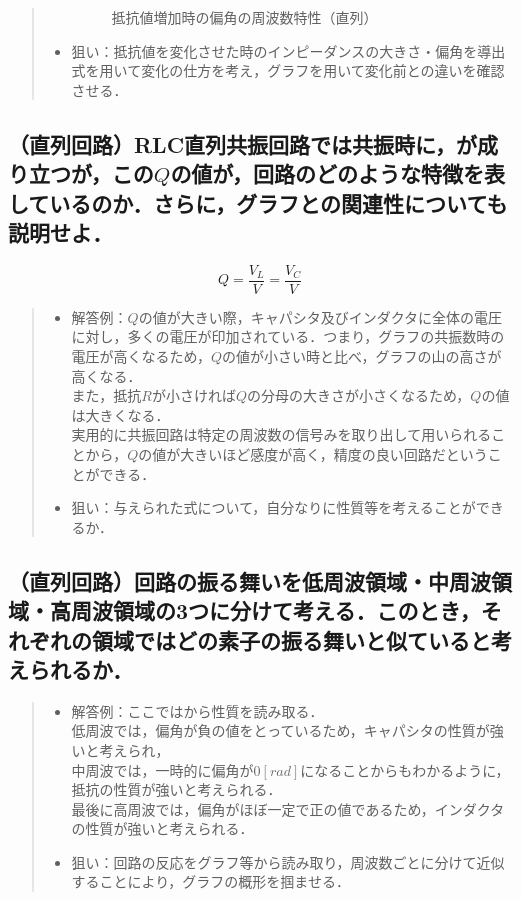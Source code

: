 \documentclass[11pt,dvipdfmx]{jarticle}
\begin{document}
\begin{quote}
\begin{itemize}
\begin{figure}[hbpt]
 \caption{抵抗値増加時の偏角の周波数特性（直列）}
 \label{fig:fig12}
\end{figure}
\item 狙い：抵抗値を変化させた時のインピーダンスの大きさ・偏角を導出式を用いて変化の仕方を考え，グラフを用いて変化前との違いを確認させる．
\end{itemize}
\end{quote}


\subsection{（直列回路）RLC直列共振回路では共振時に，が成り立つが，この$Q$の値が，回路のどのような特徴を表しているのか．さらに，グラフとの関連性についても説明せよ．}
\begin{equation}
\label{eq:7}
Q=\frac{V_{L}}{V}=\frac{V_{C}}{V}
\end{equation}
\begin{quote}
\begin{itemize}
\item 解答例：$Q$の値が大きい際，キャパシタ及びインダクタに全体の電圧に対し，多くの電圧が印加されている．つまり，グラフの共振数時の電圧が高くなるため，$Q$の値が小さい時と比べ，グラフの山の高さが高くなる．\\
また，抵抗$R$が小さければ$Q$の分母の大きさが小さくなるため，$Q$の値は大きくなる．\\
実用的に共振回路は特定の周波数の信号みを取り出して用いられることから，$Q$の値が大きいほど感度が高く，精度の良い回路だということができる．
\item 狙い：与えられた式について，自分なりに性質等を考えることができるか．
\end{itemize}
\end{quote}


\subsection{（直列回路）回路の振る舞いを低周波領域・中周波領域・高周波領域の3つに分けて考える．このとき，それぞれの領域ではどの素子の振る舞いと似ていると考えられるか．}
\begin{quote}
\begin{itemize}
\item 解答例：ここではから性質を読み取る．\\
低周波では，偏角が負の値をとっているため，キャパシタの性質が強いと考えられ，\\
中周波では，一時的に偏角が$0[rad]$になることからもわかるように，抵抗の性質が強いと考えられる．\\
最後に高周波では，偏角がほぼ一定で正の値であるため，インダクタの性質が強いと考えられる．
\item 狙い：回路の反応をグラフ等から読み取り，周波数ごとに分けて近似することにより，グラフの概形を掴ませる．
\end{itemize}
\end{quote}
\end{document}
